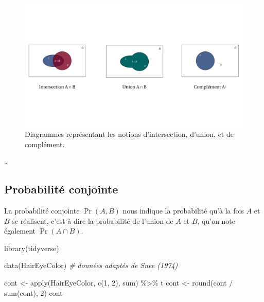 \documentclass[
  a4paper,11pt,twoside,onecolumn,openright,final,oldfontcommands]{memoir}
\newenvironment{Shaded}{\begin{snugshade}}{\end{snugshade}}
\newcommand{\CommentTok}[1]{\textcolor[rgb]{0.56,0.35,0.01}{\textit{#1}}}
\newcommand{\DecValTok}[1]{\textcolor[rgb]{0.00,0.00,0.81}{#1}}
\newcommand{\FunctionTok}[1]{\textcolor[rgb]{0.00,0.00,0.00}{#1}}
\newcommand{\NormalTok}[1]{#1}
\newcommand{\OtherTok}[1]{\textcolor[rgb]{0.56,0.35,0.01}{#1}}
\newcommand{\SpecialCharTok}[1]{\textcolor[rgb]{0.00,0.00,0.00}{#1}}
\theoremstyle{definition}
\theoremstyle{definition}
\theoremstyle{definition}
\theoremstyle{definition}
\theoremstyle{remark}
\begin{document}
\begin{figure}[!htb]

{\centering \includegraphics[width=1\linewidth]{figures/venn} 

}

\caption{Diagrammes représentant les notions d'intersection, d'union, et de complément.}\label{fig:venn}
\end{figure}

\ldots{}

\hypertarget{probabilituxe9-conjointe}{%
\subsection{Probabilité conjointe}\label{probabilituxe9-conjointe}}

La probabilité conjointe \(\Pr(A, B)\) nous indique la probabilité qu'à la fois \(A\) et \(B\) se réalisent, c'est à dire la probabilité de l'union de \(A\) et \(B\), qu'on note également \(\Pr(A \cap B)\).

\begin{Shaded}
\begin{Highlighting}[]
\FunctionTok{library}\NormalTok{(tidyverse)}

\FunctionTok{data}\NormalTok{(HairEyeColor) }\CommentTok{\# données adaptés de Snee (1974)}

\NormalTok{cont }\OtherTok{\textless{}{-}} \FunctionTok{apply}\NormalTok{(HairEyeColor, }\FunctionTok{c}\NormalTok{(}\DecValTok{1}\NormalTok{, }\DecValTok{2}\NormalTok{), sum) }\SpecialCharTok{\%\textgreater{}\%}\NormalTok{ t }
\NormalTok{cont }\OtherTok{\textless{}{-}} \FunctionTok{round}\NormalTok{(cont }\SpecialCharTok{/} \FunctionTok{sum}\NormalTok{(cont), }\DecValTok{2}\NormalTok{)}
\NormalTok{cont}
\end{Highlighting}
\end{Shaded}
\end{document}
